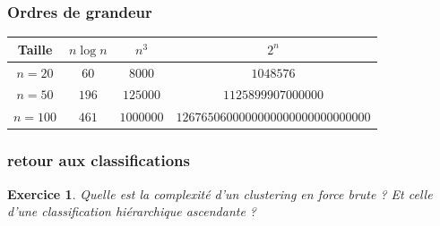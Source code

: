 \documentclass[11pt]{beamer}
\newenvironment{slide}[1]{%
\begin{frame}[environment=slide]
\frametitle{#1}
}{%
\end{frame}
}
\newtheorem{exercice}{Exercice}
\begin{document}
\begin{slide}{Ordres de grandeur}
\begin{center}
\begin{tabular}{c|c|c|c}
Taille  & $n\log n$ & $n^3$ & $2^n$ \\
\hline
$n=20$ & $60$ & $8 000$ & $1 048 576$ \\
$n=50$ & $196$ & $125 000$ & $1 125 899 907 000 000$ \\
$n=100$ & $461$ & $1 000 000$ & $1 267 650 600 000 000 000 000 000 000 000$\\
\end{tabular}
\end{center}

\end{slide}

\begin{slide}{retour aux classifications}
\begin{exercice}
Quelle est la complexité d'un clustering en force brute ? Et celle d'une classification hiérarchique ascendante ?
\end{exercice}
\end{slide}
\end{document}

